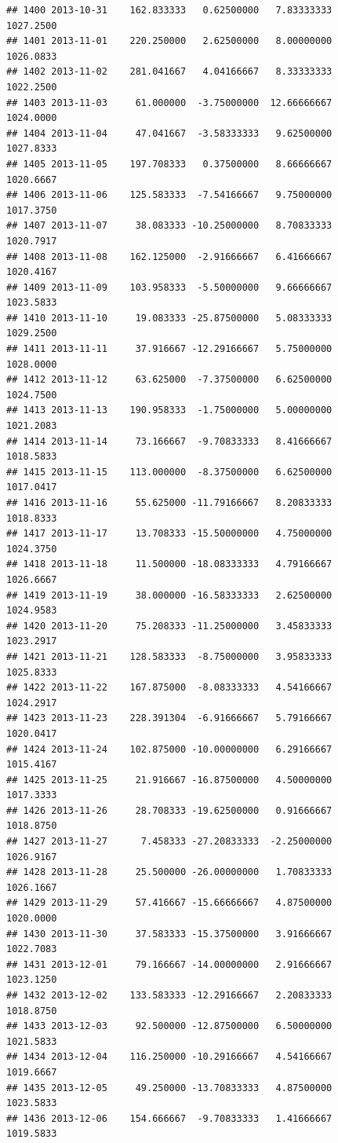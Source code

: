\documentclass[
]{article}
\begin{document}
\begin{verbatim}
## 1400 2013-10-31    162.833333   0.62500000   7.83333333    1027.2500
## 1401 2013-11-01    220.250000   2.62500000   8.00000000    1026.0833
## 1402 2013-11-02    281.041667   4.04166667   8.33333333    1022.2500
## 1403 2013-11-03     61.000000  -3.75000000  12.66666667    1024.0000
## 1404 2013-11-04     47.041667  -3.58333333   9.62500000    1027.8333
## 1405 2013-11-05    197.708333   0.37500000   8.66666667    1020.6667
## 1406 2013-11-06    125.583333  -7.54166667   9.75000000    1017.3750
## 1407 2013-11-07     38.083333 -10.25000000   8.70833333    1020.7917
## 1408 2013-11-08    162.125000  -2.91666667   6.41666667    1020.4167
## 1409 2013-11-09    103.958333  -5.50000000   9.66666667    1023.5833
## 1410 2013-11-10     19.083333 -25.87500000   5.08333333    1029.2500
## 1411 2013-11-11     37.916667 -12.29166667   5.75000000    1028.0000
## 1412 2013-11-12     63.625000  -7.37500000   6.62500000    1024.7500
## 1413 2013-11-13    190.958333  -1.75000000   5.00000000    1021.2083
## 1414 2013-11-14     73.166667  -9.70833333   8.41666667    1018.5833
## 1415 2013-11-15    113.000000  -8.37500000   6.62500000    1017.0417
## 1416 2013-11-16     55.625000 -11.79166667   8.20833333    1018.8333
## 1417 2013-11-17     13.708333 -15.50000000   4.75000000    1024.3750
## 1418 2013-11-18     11.500000 -18.08333333   4.79166667    1026.6667
## 1419 2013-11-19     38.000000 -16.58333333   2.62500000    1024.9583
## 1420 2013-11-20     75.208333 -11.25000000   3.45833333    1023.2917
## 1421 2013-11-21    128.583333  -8.75000000   3.95833333    1025.8333
## 1422 2013-11-22    167.875000  -8.08333333   4.54166667    1024.2917
## 1423 2013-11-23    228.391304  -6.91666667   5.79166667    1020.0417
## 1424 2013-11-24    102.875000 -10.00000000   6.29166667    1015.4167
## 1425 2013-11-25     21.916667 -16.87500000   4.50000000    1017.3333
## 1426 2013-11-26     28.708333 -19.62500000   0.91666667    1018.8750
## 1427 2013-11-27      7.458333 -27.20833333  -2.25000000    1026.9167
## 1428 2013-11-28     25.500000 -26.00000000   1.70833333    1026.1667
## 1429 2013-11-29     57.416667 -15.66666667   4.87500000    1020.0000
## 1430 2013-11-30     37.583333 -15.37500000   3.91666667    1022.7083
## 1431 2013-12-01     79.166667 -14.00000000   2.91666667    1023.1250
## 1432 2013-12-02    133.583333 -12.29166667   2.20833333    1018.8750
## 1433 2013-12-03     92.500000 -12.87500000   6.50000000    1021.5833
## 1434 2013-12-04    116.250000 -10.29166667   4.54166667    1019.6667
## 1435 2013-12-05     49.250000 -13.70833333   4.87500000    1023.5833
## 1436 2013-12-06    154.666667  -9.70833333   1.41666667    1019.5833

\end{verbatim}
\end{document}
